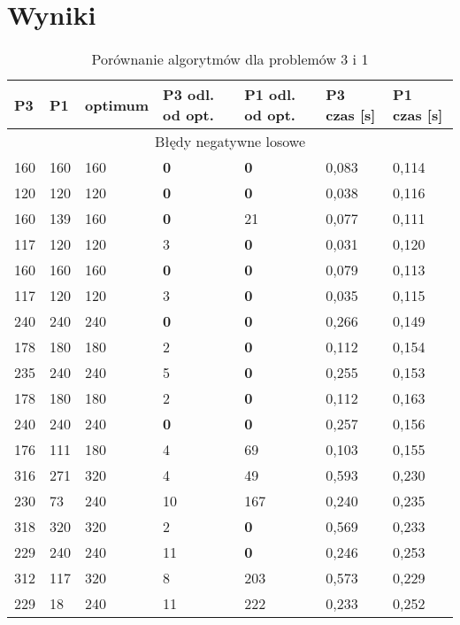 \documentclass[a4paper]{article}
\begin{document}
\section{Wyniki}

\begin{table}[H]
\caption{Porównanie algorytmów dla problemów 3 i 1}
\begin{tabular}{|p{1.6cm}|p{1.6cm}|p{1.6cm}|p{1.6cm}|p{1.6cm}|p{1.6cm}|p{1.6cm}|}
\hline
\multicolumn{1}{|l|}{P3} & \multicolumn{1}{l|}{P1} &
\multicolumn{1}{l|}{optimum} & \multicolumn{1}{l|}{P3 odl. od opt.} &
\multicolumn{1}{l|}{P1 odl. od opt.} &
\multicolumn{1}{l|}{P3 czas [s]} &
\multicolumn{1}{l|}{P1 czas [s]} \\ \hline
\multicolumn{7}{|c|}{Błędy negatywne losowe} \\ \hline
160 & 160 & 160 & \textbf{0} & \textbf{0} & 0,083 & 0,114 \\ \hline
120 & 120 & 120 & \textbf{0} & \textbf{0} & 0,038 & 0,116 \\ \hline
160 & 139 & 160 & \textbf{0} & 21 & 0,077 & 0,111 \\ \hline
117 & 120 & 120 & 3 & \textbf{0} & 0,031 & 0,120 \\ \hline
160 & 160 & 160 & \textbf{0} & \textbf{0} & 0,079 & 0,113 \\ \hline
117 & 120 & 120 & 3 & \textbf{0} & 0,035 & 0,115 \\ \hline
240 & 240 & 240 & \textbf{0} & \textbf{0} & 0,266 & 0,149 \\ \hline
178 & 180 & 180 & 2 & \textbf{0} & 0,112 & 0,154 \\ \hline
235 & 240 & 240 & 5 & \textbf{0} & 0,255 & 0,153 \\ \hline
178 & 180 & 180 & 2 & \textbf{0} & 0,112 & 0,163 \\ \hline
240 & 240 & 240 & \textbf{0} & \textbf{0} & 0,257 & 0,156 \\ \hline
176 & 111 & 180 & 4 & 69 & 0,103 & 0,155 \\ \hline
316 & 271 & 320 & 4 & 49 & 0,593 & 0,230 \\ \hline
230 & 73 & 240 & 10 & 167 & 0,240 & 0,235 \\ \hline
318 & 320 & 320 & 2 & \textbf{0} & 0,569 & 0,233 \\ \hline
229 & 240 & 240 & 11 & \textbf{0} & 0,246 & 0,253 \\ \hline
312 & 117 & 320 & 8 & 203 & 0,573 & 0,229 \\ \hline
229 & 18 & 240 & 11 & 222 & 0,233 & 0,252 \\ \hline

\end{tabular}
\end{table}
\end{document}
